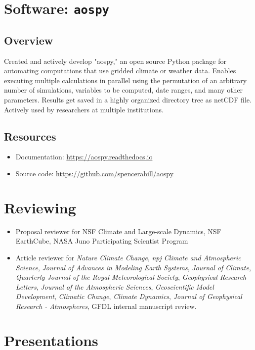 \documentclass[12pt,letterpaper]{shillcv}
\begin{document}
\section*{Software: \texttt{aospy}}
\label{sec:orgcea0d3e}
\subsection*{Overview}
\label{sec:org7424b7f}
Created and actively develop "aospy," an open source Python package for
automating computations that use gridded climate or weather data.  Enables
executing multiple calculations in parallel using the permutation of an
arbitrary number of simulations, variables to be computed, date ranges, and many
other parameters.  Results get saved in a highly organized directory tree as
netCDF file.  Actively used by researchers at multiple institutions.

\subsection*{Resources}
\label{sec:orgef4abce}
\begin{itemize}
\item Documentation: \url{https://aospy.readthedocs.io}
\item Source code: \url{https://github.com/spencerahill/aospy}
\end{itemize}
\section*{Reviewing}
\label{sec:org14b66ad}
\begin{itemize}
\item Proposal reviewer for NSF Climate and Large-scale Dynamics, NSF EarthCube,
NASA Juno Participating Scientist Program
\item Article reviewer for \emph{Nature Climate Change}, \emph{npj Climate and Atmospheric
Science}, \emph{Journal of Advances in Modeling Earth Systems}, \emph{Journal of
Climate}, \emph{Quarterly Journal of the Royal Meteorological Society},
\emph{Geophysical Research Letters}, \emph{Journal of the Atmospheric Sciences},
\emph{Geoscientific Model Development}, \emph{Climatic Change}, \emph{Climate Dynamics},
\emph{Journal of Geophysical Research - Atmospheres}, GFDL internal manuscript
review.
\end{itemize}

\section*{Presentations}
\label{sec:org7b25e71}
\end{document}
